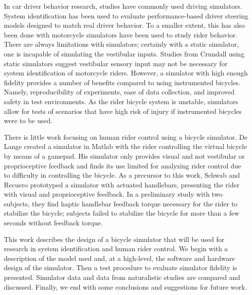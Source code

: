 \documentclass[11pt,a4paper,reqno]{amsart}
\begin{document}
In car driver behavior research, studies have commonly used driving simulators\cite{steen2011}.
System identification has been used to evaluate performance-based driver steering models designed to match real driver
behavior\cite{pilutti1999,steen2011}.
To a smaller extent, this has also been done with motorcycle simulators have been used to study rider
behavior\cite{kovacsova2015}.
There are always limitations with simulators;
certainly with a static simulator, one is incapable of simulating the vestibular inputs.
Studies from Crundall using static simulators suggest vestibular sensory input may not be necessary for system
identification of motorcycle riders\cite{crundall2012}.
However, a simulator with high enough fidelity provides a number of benefits compared to using instrumented bicycles.
Namely, reproducibility of experiments, ease of data collection, and improved safety in test environments.
As the rider bicycle system is unstable, simulators allow for tests of scenarios that have high risk of injury if
instrumented bicycles were to be used.

There is little work focusing on human rider control using a bicycle simulator.
De Lange created a simulator in Matlab with the rider controlling the virtual bicycle by means of a
gamepad\cite{delange2011}.
His simulator only provides visual and not vestibular or proprioceptive feedback and finds its use limited for
analyzing rider control due to difficulty in controlling the bicycle.
As a precursor to this work, Schwab and Recuero prototyped a simulator with actuated handlebars\cite{schwab2013},
presenting the rider with visual and proprioceptive feedback.
In a preliminary study with two subjects, they find haptic handlebar feedback torque necessary for the rider to
stabilize the bicycle;
subjects failed to stabilize the bicycle for more than a few seconds without feedback torque.

This work describes the design of a bicycle simulator that will be used for research in system identification and human
rider control.
We begin with a description of the model used and, at a high-level, the software and hardware design of the simulator.
Then a test procedure to evaluate simulator fidelity is presented.
Simulator data and data from naturalistic studies are compared and discussed.
Finally, we end with some conclusions and suggestions for future work.
\end{document}
